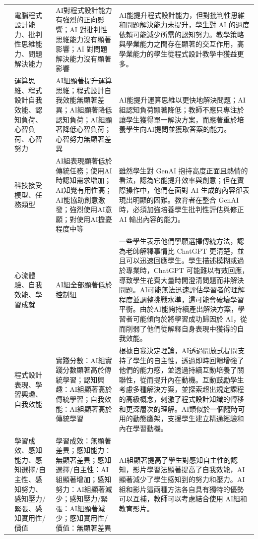 \begin{longtable}{p{} p{} p{} p{}}
\cite{omeh2025pbl} & 電腦程式設計能力、批判性思維能力、問題解決能力 & AI對程式設計能力有強烈的正向影響；AI 對批判性思維能力沒有顯著影響；AI 對問題解決能力沒有顯著影響 & AI能提升程式設計能力，但對批判性思維和問題解決能力未提升，學生對 AI 的過度依賴可能減少所需的認知努力。教學策略與學業能力之間存在顯著的交互作用，高學業能力的學生從程式設計教學中獲益更多。 \\
\cite{yan2025llm} & 運算思維、程式設計自我效能、認知負荷、心智負荷、心智努力 & AI組顯著提升運算思維；程式設計自我效能無顯著差異；AI組顯著降低認知負荷；AI組顯著降低心智負荷；心智努力無顯著差異 & AI能提升運算思維以更快地解決問題；AI組認知負荷顯著降低；教師不應只專注於讓學生獲得單一解決方案，而應著重於培養學生向AI提問並獲取答案的能力。 \\
\cite{kohen2025integrating} & 科技接受模型、任務類型 & AI組表現顯著低於傳統任務；使用AI時認知需求增加；AI知覺有用性高；AI能協助創意激發；強烈使用AI意願；對使用AI擔憂程度中等 & 雖然學生對 GenAI 抱持高度正面且熱情的看法，認為它能提升效率與創意；但在實際操作中，他們在面對 AI 生成的內容卻表現出明顯的困難。教育者在整合 GenAI 時，必須加強培養學生批判性評估與修正 AI 輸出內容的能力。 \\
\cite{yang2025chatgpt} & 心流體驗、自我效能、學習成就 & AI組全部顯著低於控制組 & 一些學生表示他們寧願選擇傳統方法，認為老師解釋事情比 ChatGPT 更清楚，並且可以迅速回應學生。學生描述模糊或過於專業時，ChatGPT 可能難以有效回應，導致學生花費大量時間澄清問題而非解決問題。AI可能無法迅速評估學習者的理解程度並調整挑戰水準，這可能會破壞學習平衡。由於AI能夠持續產出解決方案，學習者可能傾向於將學習成功歸因於 AI，從而削弱了他們從解釋自身表現中獲得的自我效能。 \\
\cite{tang2025enhancing} & 程式設計表現、學習興趣、自我效能 & 實踐分數：AI組實踐分數顯著高於傳統學習；認知興趣：AI組顯著高於傳統學習；自我效能：AI組顯著高於傳統學習 & 根據自我決定理論，AI透過開放式提問支持了學生的自主性，透過即時回饋增強了他們的能力感，並透過持續互動培養了關聯性，從而提升內在動機。互動鼓勵學生考慮多種解決方案，並探索超出規定課程的高級概念，刺激了程式設計知識的轉移和更深層次的理解。AI類似於一個隨時可用的動態鷹架，支援學生建立精通經驗和內在學習動機。 \\
\cite{cubillos2025generative} & 學習成效、感知能力、感知選擇/自主性、感知努力、感知壓力/緊張、感知實用性/價值 & 學習成效：無顯著差異；感知能力：無顯著差異；感知選擇/自主性：AI組顯著增加；感知努力：AI組顯著減少；感知壓力/緊張：AI組顯著減少；感知實用性/價值：無顯著差異 & AI組顯著提高了學生對感知自主性的認知，影片學習法顯著提高了自我效能，AI顯著減少了學生感知到的努力和壓力。AI組和影片這兩種方法各自具有獨特的優勢可以互補，教師可以考慮結合使用 AI組和教育影片。 \\
\end{longtable}

